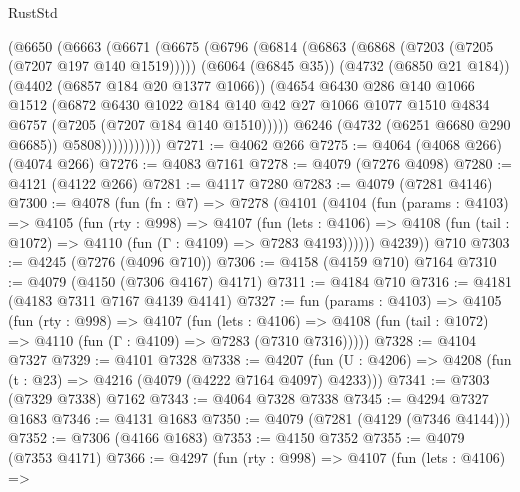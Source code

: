 \begin{lexlean}{RustStd}
\begin{coremodule}
                (@6650
                  (@6663
                    (@6671
                      (@6675
                        (@6796
                          (@6814
                            (@6863 (@6868 (@7203 (@7205 (@7207 @197 @140 @1519)))))
                            (@6064 (@6845 @35))
                            (@4732 (@6850 @21 @184))
                            (@4402 (@6857 @184 @20 @1377 @1066))
                            (@4654
                              @6430
                              @286
                              @140
                              @1066
                              @1512
                              (@6872
                                @6430
                                @1022
                                @184
                                @140
                                @42
                                @27
                                @1066
                                @1077
                                @1510
                                @4834
                                @6757
                                (@7205 (@7207 @184 @140 @1510)))))
                          @6246
                          (@4732 (@6251 @6680 @290 @6685))
                          @5808)))))))))))
@7271 := @4062 @266
@7275 := @4064 (@4068 @266) (@4074 @266)
@7276 := @4083 @7161
@7278 := @4079 (@7276 @4098)
@7280 := @4121 (@4122 @266)
@7281 := @4117 @7280
@7283 := @4079 (@7281 @4146)
@7300 := @4078
    (fun (fn : @7) =>
    @7278
      (@4101
        (@4104
          (fun (params : @4103) =>
          @4105
            (fun (rty : @998) =>
            @4107
              (fun (lets : @4106) =>
              @4108 (fun (tail : @1072) => @4110 (fun (Γ : @4109) => @7283 @4193))))))
        @4239))
    @710
@7303 := @4245 (@7276 (@4096 @710))
@7306 := @4158 (@4159 @710) @7164
@7310 := @4079 (@4150 (@7306 @4167) @4171)
@7311 := @4184 @710
@7316 := @4181 (@4183 @7311 @7167 @4139 @4141)
@7327 := fun (params : @4103) =>
  @4105
    (fun (rty : @998) =>
    @4107
      (fun (lets : @4106) =>
      @4108 (fun (tail : @1072) => @4110 (fun (Γ : @4109) => @7283 (@7310 @7316)))))
@7328 := @4104 @7327
@7329 := @4101 @7328
@7338 := @4207 (fun (U : @4206) => @4208 (fun (t : @23) => @4216 (@4079 (@4222 @7164 @4097) @4233)))
@7341 := @7303 (@7329 @7338) @7162
@7343 := @4064 @7328 @7338
@7345 := @4294 @7327 @1683
@7346 := @4131 @1683
@7350 := @4079 (@7281 (@4129 (@7346 @4144)))
@7352 := @7306 (@4166 @1683)
@7353 := @4150 @7352
@7355 := @4079 (@7353 @4171)
@7366 := @4297
    (fun (rty : @998) =>
    @4107
      (fun (lets : @4106) =>

\end{coremodule}
\end{lexlean}
